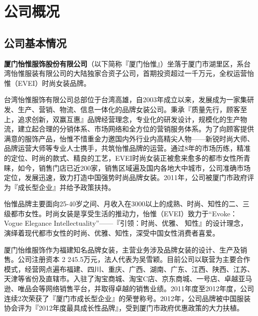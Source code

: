 
\chapter{公司概况}

\section{公司基本情况}
{\bfseries 厦门怡惟服饰股份有限公司}（以下简称『厦门怡惟』）坐落于厦门市湖里区，系台湾怡惟服装有限公司的大陆独家合资子公司，首期投资超过一千万元，全权运营怡惟（EVEI）时尚女装品牌。

台湾怡惟服饰有限公司总部位于台湾高雄，自2003年成立以来，发展成为一家集研发、生产、营销、物流、信息一体化的品牌女装公司。秉承『质量先行，顾客至上，追求创新，双赢互惠』品牌经营理念，专业化的研发设计，规模化的生产物流，建立起合理的分销体系、市场网络和全方位的营销服务体系。为了向顾客提供满意的服饰产品，怡惟不惜重金力邀国内外行业内高精尖人物——新锐时尚大师、品牌运营大师等专业人士携手，共筑怡惟品牌的运营。通过8年的市场历练，精准的定位、时尚的款式、精良的工艺，EVEI时尚女装正被愈来愈多的都市女性所青睐，如今，销售门店已近200家，销售区域遍及国内各地大中城市，公司准确市场定位，发展迅速，致力打造中国强势时尚品牌女装。2011年，公司被厦门市政府评为『成长型企业』并给予政策扶持。

怡惟品牌主要面向25-40岁之间、月收入在3000以上的成熟、时尚、知性的二、三级都市女性。时尚女装是享受生活的推动力，怡惟（EVEI）致力于“Evoke：Vogue  Elegance  Intellectuality”——『引领：时尚、优雅、 知性』的设计理念，演绎着现代都市女性的时尚、优雅、知性，深受中国女性消费者喜爱。


厦门怡维服饰作为福建知名品牌女装，主营业务涉及品牌女装的设计、生产及销售。公司注册资本 2 245.5万元，法人代表为吴雪颖。目前公司以联营为主要合作模式，经营网点遍布福建、四川、重庆、广西、湖南、广东、江西、陕西、江苏、天津等省份及直辖市。入驻了淘宝商城、淘宝C店、京东商城、一号店、卓越亚马逊、唯品会等网络销售平台，并取得卓越的销售业绩。2011年度至2012年度，公司连续2次荣获了『厦门市成长型企业』的荣誉称号。2012年，公司品牌被中国服装协会评为『2012年度最具成长性品牌』，受到厦门市政府优惠政策的大力扶植。

